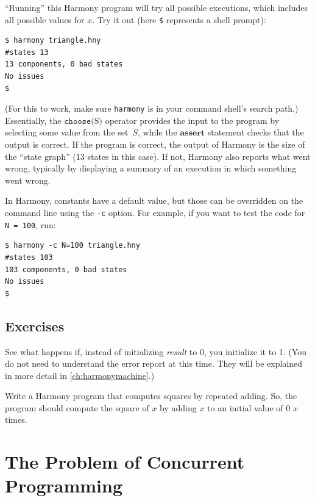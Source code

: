 \documentclass{report}
\newenvironment{code}{
\tcolorbox
}{
\endtcolorbox
}
\begin{document}
``Running'' this Harmony program will try all possible executions, which
includes all possible values for $x$.  Try it out (here \texttt{\$}
represents a shell prompt):

\begin{code}
\begin{verbatim}
$ harmony triangle.hny
#states 13
13 components, 0 bad states
No issues
$
\end{verbatim}
\end{code}

(For this to work, make sure \texttt{harmony} is in your command shell's search path.)
Essentially, the $\texttt{choose}($S$)$
%
operator provides the input to the program by selecting some value from the
set~$S$, while the $\textbf{assert}$ statement checks that the output is
correct.  If the program is correct, the output of Harmony is the size of the
``state graph'' (13 states in this case).  If not, Harmony also
reports what went wrong, typically by displaying a summary of an execution in
which something went wrong.

In Harmony, constants have a default value,
but those can be overridden on the command
line using the \texttt{-c} option.
%
For example, if you want to test the code for \texttt{N = 100}, run:
\begin{code}
\begin{verbatim}
$ harmony -c N=100 triangle.hny
#states 103
103 components, 0 bad states
No issues
$
\end{verbatim}
\end{code}

\section*{Exercises}
\begin{problems}
\item See what happens if, instead of initializing \textit{result} to 0,
you initialize it to 1.  (You do not need to understand the error report at this time.  They will be explained in more detail in \autoref{ch:harmonymachine}.)
\item Write a Harmony program that computes squares by repeated adding.  So, the program
should compute the square of $x$ by adding $x$ to an initial value of 0 $x$ times.
\end{problems}

\chapter{The Problem of Concurrent Programming}
\label{ch:concurrent}
\end{document}
